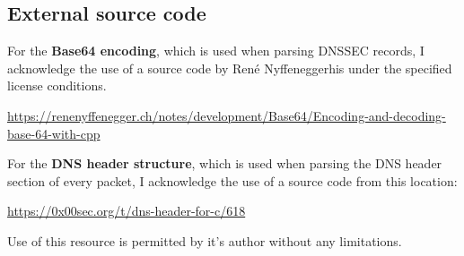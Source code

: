 \subsection{External source code}

For the \textbf{Base64 encoding}, which is used when parsing DNSSEC records, I acknowledge the use of a source code by René Nyffeneggerhis under the specified license conditions.

\url{https://renenyffenegger.ch/notes/development/Base64/Encoding-and-decoding-base-64-with-cpp}

\vspace{1cm}
For the \textbf{DNS header structure}, which is used when parsing the DNS header section of every packet, I acknowledge the use of a source code from this location:

\url{https://0x00sec.org/t/dns-header-for-c/618}

Use of this resource is permitted by it's author without any limitations.